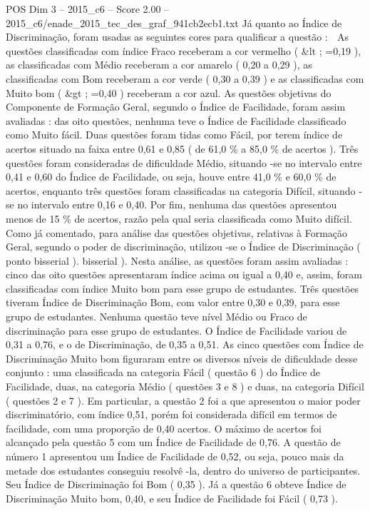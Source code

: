 \begin{textsample}{POS Dim 3 – 2015\_c6 – Score 2.00 – 2015\_c6/enade\_2015\_tec\_des\_graf\_941cb2ecb1.txt}
Já quanto ao Índice de Discriminação, foram usadas as seguintes cores para qualificar a questão :  As questões classificadas com índice Fraco receberam a cor vermelho ( \&lt ; =0,19 ), as classificadas com Médio receberam a cor amarelo ( 0,20 a 0,29 ), as classificadas com Bom receberam a cor verde ( 0,30 a 0,39 ) e as classificadas com Muito bom ( \&gt ; =0,40 ) receberam a cor azul.
As questões objetivas do Componente de Formação Geral, segundo o Índice de Facilidade, foram assim avaliadas : das oito questões, nenhuma teve o Índice de Facilidade classificado como Muito fácil.
Duas questões foram tidas como Fácil, por terem índice de acertos situado na faixa entre 0,61 e 0,85 ( de 61,0 \% a 85,0 \% de acertos ).
Três questões foram consideradas de dificuldade Médio, situando -se no intervalo entre 0,41 e 0,60 do Índice de Facilidade, ou seja, houve entre 41,0 \% e 60,0 \% de acertos, enquanto três questões foram classificadas na categoria Difícil, situando -se no intervalo entre 0,16 e 0,40.
Por fim, nenhuma das questões apresentou menos de 15 \% de acertos, razão pela qual seria classificada como Muito difícil.
Como já comentado, para análise das questões objetivas, relativas à Formação Geral, segundo o poder de discriminação, utilizou -se o Índice de Discriminação ( ponto bisserial ). bisserial ).
Nesta análise, as questões foram assim avaliadas : cinco das oito questões apresentaram índice acima ou igual a 0,40 e, assim, foram classificadas com índice Muito bom para esse grupo de estudantes.
Três questões tiveram Índice de Discriminação Bom, com valor entre 0,30 e 0,39, para esse grupo de estudantes.
Nenhuma questão teve nível Médio ou Fraco de discriminação para esse grupo de estudantes.
O Índice de Facilidade variou de 0,31 a 0,76, e o de Discriminação, de 0,35 a 0,51.
As cinco questões com Índice de Discriminação Muito bom figuraram entre os diversos níveis de dificuldade desse conjunto : uma classificada na categoria Fácil ( questão 6 ) do Índice de Facilidade, duas, na categoria Médio ( questões 3 e 8 ) e duas, na categoria Difícil ( questões 2 e 7 ).
Em particular, a questão 2 foi a que apresentou o maior poder discriminatório, com índice 0,51, porém foi considerada difícil em termos de facilidade, com uma proporção de 0,40 acertos.
O máximo de acertos foi alcançado pela questão 5 com um Índice de Facilidade de 0,76.
A questão de número 1 apresentou um Índice de Facilidade de 0,52, ou seja, pouco mais da metade dos estudantes conseguiu resolvê -la, dentro do universo de participantes.
Seu Índice de Discriminação foi Bom ( 0,35 ).
Já a questão 6 obteve Índice de Discriminação Muito bom, 0,40, e seu Índice de Facilidade foi Fácil ( 0,73 ).

\end{textsample}
